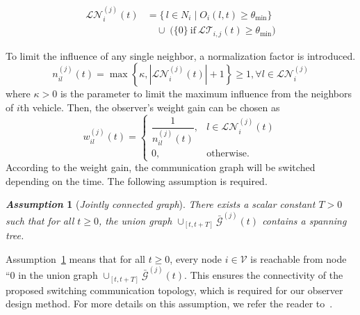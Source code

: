 \documentclass{ifacconf}
\def\V{\mathcal{V}} %
\def\G{\mathcal{G}} %
\def\LT{\mathcal{LT}} %
\def\O{\mathcal{O}} %
\newtheorem{assumption}{\it \textbf{Assumption}}%
\begin{document}
\begin{align}
\mathcal{LN}^{(j)}_{i}(t)
&= \Big\{\, l \in N_i \;\big|\; O_i(l,t) \ge \theta_{\min} \Big\} \nonumber \\
&\quad \cup\;
\Big( \{0\}\ \text{if}\ \mathcal{LT}_{i,j}(t) \ge \theta_{\min} \Big)
\end{align}


To limit the influence of any single neighbor, a normalization factor is introduced.
\begin{equation}\label{new_setneibor}
n_{il}^{(j)}(t)=\max \left\{\kappa,\left|\mathcal{LN}_i^{(j)}(t)\right|+1\right\} \geq 1, \forall l\in \mathcal{LN}_i^{(j)}
\end{equation}
where $\kappa >0$ is the parameter to limit the maximum influence from the neighbors of $i$th vehicle. 
Then, the observer's weight gain can be chosen as
\begin{equation}\label{design_gain}
    w_{il}^{(j)}(t) = \begin{cases}
        \dfrac{1}{n_{il}^{(j)}(t)}, & l \in \mathcal{LN}_i^{(j)}(t)\\
        0 ,& \text{otherwise}.
    \end{cases}
\end{equation}
%
According to the weight gain, the communication graph will be switched depending on the time. The following assumption is required.
\begin{assumption}[\it Jointly connected graph]%
\label{ass_graph}
There exists a scalar constant $T > 0$ such that for all $t\geq 0$, the union graph $\cup _{[t, t+ T]}\bar{\G}^{(j)}(t)$ contains a spanning tree.
\end{assumption}
Assumption~\ref{ass_graph} means that for all $t\geq 0$, every node $i \in\V$ is reachable from node ``0 in the union graph $\cup _{[t, t+ T]}\bar{\G}^{(j)}(t)$. This ensures the connectivity of the proposed switching communication topology, which is required for our observer design method. For more details on this assumption, we refer the reader to~\cite{hao2024eventtriggered}.
\end{document}

